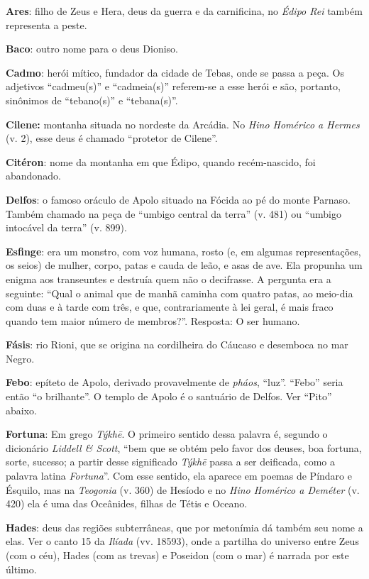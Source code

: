 \textbf{Ares}: filho de Zeus e Hera, deus da guerra e da carnificina,
no \emph{Édipo Rei} também representa a peste.

\textbf{Baco}: outro nome para o deus Dioniso.

\textbf{Cadmo}: herói mítico, fundador da cidade de Tebas, onde se
passa a peça. Os adjetivos ``cadmeu(s)'' e ``cadmeia(s)'' referem-se a
esse herói e são, portanto, sinônimos de ``tebano(s)'' e ``tebana(s)''.

\textbf{Cilene:} montanha situada no nordeste da Arcádia. No
\emph{Hino Homérico a Hermes} (v. 2), esse deus é chamado ``protetor de
Cilene''.

\textbf{Citéron}: nome da montanha em que Édipo, quando
recém-nascido, foi abandonado.

\textbf{Delfos}: o famoso oráculo de Apolo situado na Fócida ao pé do
monte Parnaso. Também chamado na peça de ``umbigo central da terra'' (v.
481) ou ``umbigo intocável da terra'' (v. 899).

\textbf{Esfinge}: era um monstro, com voz humana, rosto (e, em
algumas representações, os seios) de mulher, corpo, patas e cauda de
leão, e asas de ave. Ela propunha um enigma aos transeuntes e destruía
quem não o decifrasse. A pergunta era a seguinte: ``Qual o animal que de
manhã caminha com quatro patas, ao meio-dia com duas e à tarde com três,
e que, contrariamente à lei geral, é mais fraco quando tem maior número
de membros?''. Resposta: O ser humano.

\textbf{Fásis}: rio Rioni, que se origina na cordilheira do Cáucaso
e desemboca no mar Negro.

\textbf{Febo}: epíteto de Apolo, derivado provavelmente de
\emph{pháos}, ``luz''. ``Febo'' seria então ``o brilhante''. O templo de
Apolo é o santuário de Delfos. Ver ``Pito'' abaixo.

\textbf{Fortuna}: Em grego \emph{Týkhē}. O primeiro sentido dessa
palavra é, segundo o dicionário \emph{Liddell \& Scott}, ``bem que se
obtém pelo favor dos deuses, boa fortuna, sorte, sucesso; a partir desse
significado \emph{Týkhē} passa a ser deificada, como a palavra latina
\emph{Fortuna}''. Com esse sentido, ela aparece em poemas de Píndaro e
Ésquilo, mas na \emph{Teogonia} (v. 360) de Hesíodo e no \emph{Hino
Homérico a Deméter} (v. 420) ela é uma das Oceânides, filhas de Tétis e
Oceano.

\textbf{Hades}: deus das regiões subterrâneas, que por metonímia dá
também seu nome a elas. Ver o canto 15 da \emph{Ilíada} (vv. 18593),
onde a partilha do universo entre Zeus (com o céu), Hades (com as
trevas) e Poseidon (com o mar) é narrada por este último.

